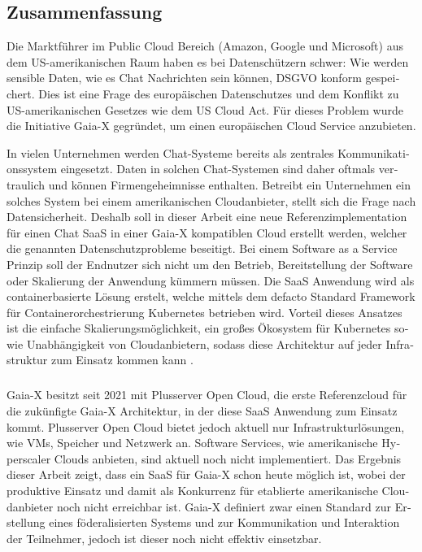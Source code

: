 \begin{otherlanguage}{ngerman}
	\chapter*{Zusammenfassung}

	Die Marktführer im Public Cloud Bereich (Amazon, Google und Microsoft) aus dem US-amerikanischen Raum
	haben es bei Datenschützern schwer:
	Wie werden sensible Daten, wie es Chat Nachrichten sein können, DSGVO konform gespeichert.
	Dies ist eine Frage des europäischen Datenschutzes und dem Konflikt zu US-amerikanischen Gesetzes wie dem US Cloud Act.
	Für dieses Problem wurde die Initiative Gaia-X gegründet, um einen europäischen Cloud Service anzubieten.

	In vielen Unternehmen werden Chat-Systeme bereits als zentrales Kommunikationssystem eingesetzt.
	Daten in solchen Chat-Systemen sind daher oftmals vertraulich und können Firmengeheimnisse enthalten.
	Betreibt ein Unternehmen ein solches System bei einem amerikanischen Cloudanbieter, stellt sich die Frage nach Datensicherheit.
	Deshalb soll in dieser Arbeit eine neue Referenzimplementation für einen Chat \ac{SaaS} in einer Gaia-X kompatiblen Cloud erstellt werden,
	welcher die genannten Datenschutzprobleme beseitigt.
	Bei einem Software as a Service Prinzip soll der Endnutzer sich nicht um den Betrieb, Bereitstellung der Software
	oder Skalierung der Anwendung kümmern müssen. 
	Die \ac{SaaS} Anwendung wird als containerbasierte Lösung erstelt, welche mittels dem defacto Standard Framework für 
	Containerorchestrierung Kubernetes \cite{Burns2019} betrieben wird. Vorteil dieses Ansatzes ist die einfache Skalierungsmöglichkeit,
	ein großes Ökosystem für Kubernetes sowie Unabhängigkeit von Cloudanbietern, 
	sodass diese Architektur auf jeder Infrastruktur zum Einsatz kommen kann \cite{Burns2019}.
	\paragraph{}
	Gaia-X besitzt seit 2021 mit Plusserver Open Cloud, die erste Referenzcloud für die zukünfigte Gaia-X Architektur,
	in der diese \ac{SaaS} Anwendung zum Einsatz kommt.	
	Plusserver Open Cloud bietet jedoch aktuell nur Infrastrukturlösungen, wie \acp{VM}, Speicher und Netzwerk an. 
	Software Services, wie amerikanische Hyperscaler Clouds anbieten, sind aktuell noch nicht implementiert.
	Das Ergebnis dieser Arbeit zeigt, dass ein \ac{SaaS} für Gaia-X schon heute möglich ist, 
	wobei der produktive Einsatz und damit als Konkurrenz für etablierte amerikanische Cloudanbieter noch nicht erreichbar ist. 
	Gaia-X definiert zwar einen Standard zur Erstellung eines föderalisierten Systems und zur Kommunikation und Interaktion 
	der Teilnehmer, jedoch ist dieser noch nicht effektiv einsetzbar. 

\end{otherlanguage}